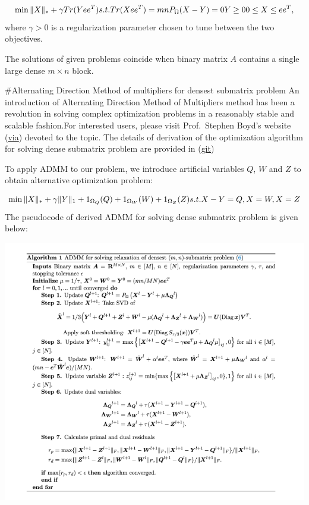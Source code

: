 \documentclass[]{article}
\begin{document}
\[\begin{equation}
    \min \|X \|_* + \gamma {Tr}(Y ee^T)  \\
    {s.t.}{Tr}(X ee^T) = mn    \\
            P_\Omega(X - Y) = 0  \\
            Y \ge 0 \\
            0 \le X \le ee^T,
\end{equation}\] where \(\gamma >0\) is a regularization parameter
chosen to tune between the two objectives.

The solutions of given problems coincide when binary matrix \(A\)
contains a single large dense \(m\times n\) block.

\#Alternating Direction Method of multipliers for densest submatrix
problem An introduction of Alternating Direction Method of Multipliers
method has been a revolution in solving complex optimization problems in
a reasonably stable and scalable fashion.For interested users, please
visit Prof.~Stephen Boyd's website
(\href{http://stanford.edu/~boyd/papers/admm_distr_stats.html}{via})
devoted to the topic. The details of derivation of the optimization
algorithm for solving dense submatrix problem are provided in
(\href{https://github.com/bpames/Densest-Submatrix-Paper/blob/master/Manuscript/dsm-arxiv2019.pdf}{git})

To apply ADMM to our problem, we introduce artificial variables \(Q\),
\(W\) and \(Z\) to obtain alternative optimization problem:

\[\begin{equation}
    \min \|X \|_* + \gamma \|Y \|_1 +{1}_{\Omega_Q}(Q)+{1}_{\Omega_W}(W)+{1}_{\Omega_Z}(Z)\\
{s.t.}X-Y=Q,\\
     X=W, X=Z
\end{equation}\] The pseudocode of derived ADMM for solving dense
submatrix problem is given below:

\includegraphics[width=6.25in,height=\textheight]{ALG.png}
\end{document}
